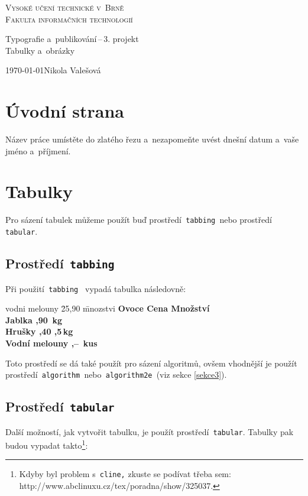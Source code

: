 \documentclass[a4paper,11pt]{article}
\begin{document}
\begin{titlepage}
	\centering
	{\textsc{\Huge Vysoké učení technické v~Brně\\ \vspace{2.5mm}
	\huge Fakulta informačních technologií}}


	{\LARGE Typografie a~publikování\,--\,3. projekt\\ \vspace{2mm}
	\Huge Tabulky a~obrázky}


	{\Large \today \hfill Nikola Valešová }
\end{titlepage}

\section{Úvodní strana}
Název práce umístěte do zlatého řezu a~nezapomeňte uvést dnešní datum a~vaše jméno a~příjmení.

\section{Tabulky}
Pro sázení tabulek můžeme použít buď prostředí\texttt{ tabbing }nebo prostředí\texttt{ tabular}.

\subsection{Prostředí\texttt{ tabbing}}
Při použití\texttt{ tabbing } vypadá tabulka následovně:

\begin{tabbing}
vodni melouny \quad \= 25,90 \quad \= mnozstvi \kill
\bfseries Ovoce \> \bfseries Cena \> \bfseries Množství\\
Jablka ,90 \,kg\\
Hrušky ,40 ,5\,kg\\
Vodní melouny ,-- \,kus\\
\end{tabbing}

\noindent Toto prostředí se dá také použít pro sázení algoritmů, ovšem vhodnější je použít 
prostředí\texttt{ algorithm }nebo\texttt{ algorithm2e }(viz sekce \ref{sekce3}).

\subsection{Prostředí\texttt{ tabular}}
Další možností, jak vytvořit tabulku, je použít prostředí\texttt{ tabular}. Tabulky pak 
budou vypadat takto\footnote{Kdyby byl problem s\texttt{ cline,} zkuste se podívat třeba sem: 
http://www.abclinuxu.cz/tex/poradna/show/325037.}: \bigskip
\end{document}
